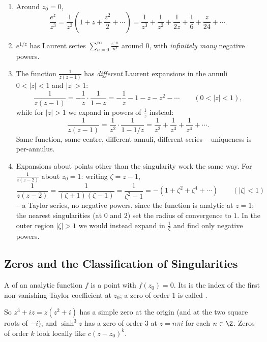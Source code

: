 \begin{example}
	\begin{enumerate}[label=(\roman*)]
		\item Around $z_0 = 0$,
		$$
		\frac{e^z}{z^3} = \frac{1}{z^3}\left(1 + z + \frac{z^2}{2} + \cdots\right) = \frac{1}{z^3} + \frac{1}{z^2} + \frac{1}{2z} + \frac{1}{6} + \frac{z}{24} + \cdots.
		$$
		\item $e^{1/z}$ has Laurent series $\sum_{n=0}^\infty \frac{z^{-n}}{n!}$ around $0$, with \emph{infinitely many} negative powers.
		\item The function $\frac{1}{z(z-1)}$ has \emph{different} Laurent expansions in the annuli $0 < |z| < 1$ and $|z| > 1$:
		$$
		\frac{1}{z(z - 1)} = -\frac{1}{z} \cdot \frac{1}{1 - z} = -\frac 1z - 1 - z - z^2 - \cdots \qquad (0 < |z| < 1),
		$$
		while for $|z| > 1$ we expand in powers of $\frac 1z$ instead:
		$$
		\frac{1}{z(z-1)} = \frac{1}{z^2} \cdot \frac{1}{1 - 1/z} = \frac{1}{z^2} + \frac{1}{z^3} + \frac{1}{z^4} + \cdots.
		$$
		Same function, same centre, different annuli, different series -- uniqueness is per-annulus.
		\item Expansions about points other than the singularity work the same way. For $\frac{1}{z(z-2)}$ about $z_0 = 1$: writing $\zeta = z - 1$,
		$$
		\frac{1}{z(z - 2)} = \frac{1}{(\zeta + 1)(\zeta - 1)} = \frac{1}{\zeta^2 - 1} = -\left(1 + \zeta^2 + \zeta^4 + \cdots\right) \qquad (|\zeta| < 1)
		$$
		-- a Taylor series, no negative powers, since the function is analytic at $z = 1$; the nearest singularities (at $0$ and $2$) set the radius of convergence to $1$. In the outer region $|\zeta| > 1$ we would instead expand in $\frac{1}{\zeta}$ and find only negative powers.
	\end{enumerate}
\end{example}

\subsection{Zeros and the Classification of Singularities}

\begin{definition}
	A  of an analytic function $f$ is a point with $f(z_0) = 0$. Its  is the index of the first non-vanishing Taylor coefficient at $z_0$; a zero of order 1 is called .
\end{definition}

So $z^3 + iz = z(z^2 + i)$ has a simple zero at the origin (and at the two square roots of $-i$), and $\sinh^3 z$ has a zero of order 3 at $z = n\pi i$ for each $n \in \Z$. Zeros of order $k$ look locally like $c(z - z_0)^k$.


